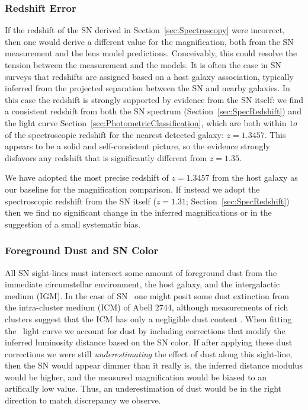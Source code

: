 \subsubsection{Redshift Error}
\label{sec:RedshiftError}

If the redshift of the SN derived in Section~\ref{sec:Spectroscopy}
were incorrect, then one would derive a different value for the
magnification, both from the SN measurement and the lens model
predictions.  Conceivably, this could resolve the tension between the
measurement and the models.  It is often the case in SN surveys that
redshifts are assigned based on a host galaxy association, typically
inferred from the projected separation between the SN and nearby
galaxies.  In this case the redshift is strongly supported by
evidence from the SN
itself: we find a consistent redshift from both the SN spectrum
(Section~\ref{sec:SpecRedshift}) and the light curve
Section~\ref{sec:PhotometricClassification}, which are both within
$1\sigma$ of the spectroscopic redshift for the nearest detected
galaxy: $z=1.3457$. This appears to be a solid and self-consistent
picture, so the evidence strongly disfavors any redshift that is
significantly different from $z=1.35$.

We have adopted the most precise redshift of $z=1.3457$ from
the host galaxy as our baseline for the magnification comparison.  If
instead we adopt the spectroscopic redshift from the SN itself
($z=1.31$; Section~\ref{sec:SpecRedshift}) then we find no significant
change in the inferred magnifications or in the suggestion of a small
systematic bias.


\subsubsection{Foreground Dust and SN Color}
\label{sec:ForegroundDust}

All SN sight-lines must intersect some amount of foreground dust from
the immediate circumstellar environment, the host galaxy, and the
intergalactic medium (IGM). In the case of SN \tomas\ one might posit
some dust extinction from the intra-cluster medium (ICM) of Abell
2744, although measurements of rich clusters suggest that the ICM has
only a negligible dust
content \citep{Maoz:1995,Stickel:2002,Bai:2007}.  When fitting
the \tomas\ light curve we account for dust by including corrections
that modify the inferred luminosity distance based on the SN color.
If after applying these dust corrections we were still {\it
underestimating} the effect of dust along this sight-line, then the SN
would appear dimmer than it really is, the inferred distance modulus would be higher,
and the measured magnification would be biased to an artifically low
value. Thus, an underestimation of dust would be in the right
direction to match discrepancy we observe.

